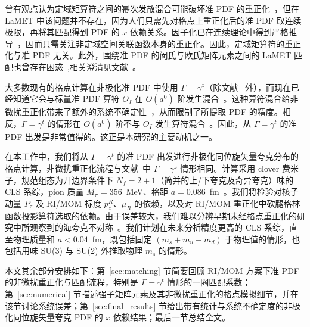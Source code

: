 曾有观点认为定域矩算符之间的幂次发散混合可能破坏准 PDF 的重正化~\cite{Rossi:2017muf,Rossi:2018zkn}，但在 LaMET 中该问题并不存在，因为人们只需先对格点上重正化后的准 PDF 取连续极限，再将其匹配得到 PDF 的 $x$ 依赖关系。因子化已在连续理论中得到严格推导~\cite{Ma:2014jla,Izubuchi:2018srq}，因而只需关注非定域空间关联函数本身的重正化。因此，定域矩算符的重正化与准 PDF 无关。此外，围绕准 PDF 的闵氏与欧氏矩阵元素之间的 LaMET 匹配也曾存在困惑~\cite{Carlson:2017gpk},相关澄清见文献~\cite{Ji:2017rah,Briceno:2017cpo}。

大多数现有的格点计算在非极化准 PDF 中使用 $\Gamma=\gamma^z$（除文献~\cite{Chen:2018xof,Alexandrou:2018pbm} 外），而现在已经知道它会与标量准 PDF 算符 $O_{I}$ 在 $O(a^0)$ 阶发生混合~\cite{Constantinou:2017sej,Chen:2017mie,Green:2017xeu}。这种算符混合给非微扰重正化带来了额外的系统不确定性~\cite{Alexandrou:2017huk,Chen:2017mzz,Green:2017xeu,Lin:2017ani}，从而限制了所提取 PDF 的精度。相反，$\Gamma=\gamma^t$ 的情形在 $O(a^0)$ 阶不与 $O_{I}$ 发生算符混合~\cite{Constantinou:2017sej,Chen:2017mie,Green:2017xeu}。因此，从 $\Gamma=\gamma^t$ 的准 PDF 出发是非常值得的。这正是本研究的主要动机之一。

在本工作中，我们将从 $\Gamma=\gamma^t$ 的准 PDF 出发进行非极化同位旋矢量夸克分布的格点计算，非微扰重正化流程与文献~\cite{Chen:2017mzz}中 $\Gamma=\gamma^z$ 情形相同。计算采用 clover 费米子，规范组态为开边界条件下 $N_f=2+1$（简并的上/下夸克及奇异夸克）味的 CLS 系综，pion 质量 $M_{\pi}=356$~MeV、格距 $a=0.086$~fm~\cite{Bruno:2014jqa}。我们将检验对核子动量 $P_z$ 及 RI/MOM 标度 $p_z^R$、$\mu_R$ 的依赖，以及对 RI/MOM 重正化中砍腿格林函数投影算符选取的依赖。由于误差较大，我们难以分辨早期未经格点重正化的研究中所观察到的海夸克不对称~\cite{Lin:2014zya,Alexandrou:2015rja,Chen:2016utp,Alexandrou:2016jqi}。我们计划在未来分析精度更高的 CLS 系综，直至物理质量和 $a<0.04$~fm，既包括固定 $(m_s+m_u+m_d)$ 于物理值的情形，也包括用味 SU(3) 与 SU(2) 外推取物理 $m_s$ 的情形。

本文其余部分安排如下：第~\ref{sec:matching} 节简要回顾 RI/MOM 方案下准 PDF 的非微扰重正化与匹配流程，特别是 $\Gamma=\gamma^t$ 情形的一圈匹配系数；第~\ref{sec:numerical} 节描述强子矩阵元素及其非微扰重正化的格点模拟细节，并在该节讨论系统误差；第~\ref{sec:final_results} 节给出带有统计与系统不确定度的非极化同位旋矢量夸克 PDF 的 $x$ 依赖结果；最后一节总结全文。
